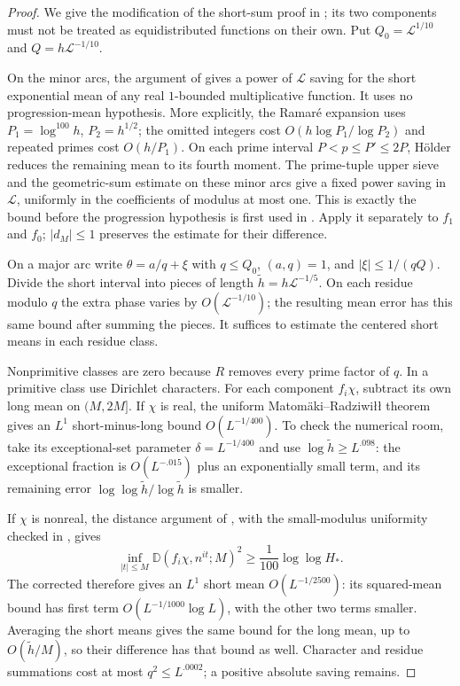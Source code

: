 \documentclass[11pt]{article}
\theoremstyle{remark}\newtheorem{remark}[theorem]{Remark}
\newcommand{\calL}{\mathcal L}
\newcommand{\dist}{\mathbb D}
\begin{document}
\begin{proof}
We give the modification of the short-sum proof in
\cite[Sections 3.4--3.6]{tt}; its two components must not be treated
as equidistributed functions on their own. Put
$Q_0=\calL^{1/10}$ and $Q=h\calL^{-1/10}$.

On the minor arcs, the argument of \cite[Section 3.5]{tt} gives a
power of $\calL$ saving for the short exponential mean of any real
$1$-bounded multiplicative function. It uses no progression-mean
hypothesis. More explicitly, the Ramar\'e expansion uses
$P_1=\log^{100}h$, $P_2=h^{1/2}$; the omitted integers cost
$O(h\log P_1/\log P_2)$ and repeated primes cost $O(h/P_1)$.
On each prime interval $P<p\le P'\le2P$, H\"older reduces the remaining
mean to its fourth moment. The prime-tuple upper sieve and the
geometric-sum estimate on these minor arcs give a fixed power saving
in $\calL$, uniformly in the coefficients of modulus at most one.
This is exactly the bound before the progression hypothesis is first
used in \cite[Section 3.6]{tt}. Apply it separately to $f_1$ and $f_0$;
$|d_M|\le1$ preserves the estimate for their difference.

On a major arc write $\theta=a/q+\xi$ with
$q\le Q_0$, $(a,q)=1$, and $|\xi|\le1/(qQ)$.
Divide the short interval into pieces of length
$\widetilde h=h\calL^{-1/5}$. On each residue modulo $q$ the extra
phase varies by $O(\calL^{-1/10})$; the resulting mean error has this
same bound after summing the pieces. It suffices to estimate the
centered short means in each residue class.

Nonprimitive classes are zero because $R$ removes every prime factor
of $q$. In a primitive class use Dirichlet characters. For each
component $f_i\chi$, subtract its own long mean on $(M,2M]$.
If $\chi$ is real, the uniform Matom\"aki--Radziwi\l\l{} theorem
\cite[Theorem 1]{mr} gives an $L^1$ short-minus-long bound
$O(L^{-1/400})$. To check the numerical room, take its exceptional-set
parameter $\delta=L^{-1/400}$ and use
$\log\widetilde h\ge L^{.098}$: the exceptional fraction is
$O(L^{-.015})$ plus an exponentially small term, and its remaining
error $\log\log\widetilde h/\log\widetilde h$ is smaller.

If $\chi$ is nonreal, the distance argument of
\cite[Lemma C.1]{mrt}, with the small-modulus uniformity checked in
\cite[Section 3.6]{tt}, gives
\[
 \inf_{|t|\le M}\dist(f_i\chi,n^{it};M)^2
                         \ge\frac1{100}\log\log H_*.
\]
The corrected \cite[Theorem A.1]{mrt} therefore gives an $L^1$ short
mean $O(L^{-1/2500})$: its squared-mean bound has first term
$O(L^{-1/1000}\log L)$, with the other two terms smaller.
Averaging the short means gives the same bound for the long mean,
up to $O(\widetilde h/M)$, so their difference has that bound as well.
Character and residue summations cost at most $q^2\le L^{.0002}$;
a positive absolute saving remains.


\end{proof}
\end{document}
